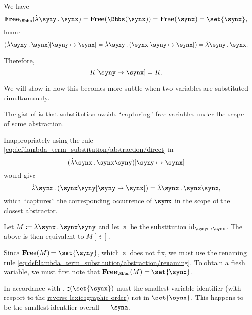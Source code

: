 \begin{example}
\begin{thmenum}
    We have
    \begin{equation*}
      \op*{Free}_\Bbbs(\qabs \syny \synx)
      =
      \op*{Free}(\Bbbs(\synx))
      =
      \op*{Free}(\synx)
      =
      \set{ \synx },
    \end{equation*}
    hence
    \begin{align*}
      (\qabs \syny \synx)[\syny \mapsto \synx]
      =
      \qabs \syny (\synx[\syny \mapsto \synx])
      =
      \qabs \syny \synx.
    \end{align*}

    Therefore,
    \begin{equation*}
      K[\syny \mapsto \synx] = K.
    \end{equation*}

    We will show in  how this becomes more subtle when two variables are substituted simultaneously.

     The gist of  is that substitution avoids \enquote{capturing} free variables under the scope of some abstraction.

    Inappropriately using the rule \eqref{eq:def:lambda_term_substitution/abstraction/direct} in
    \begin{equation*}
      (\qabs \synx \synx \syny)[\syny \mapsto \synx]
    \end{equation*}
    would give
    \begin{equation*}
      \qabs \synx (\synx \syny[\syny \mapsto \synx]) = \qabs \synx \synx \synx,
    \end{equation*}
    which \enquote{captures} the corresponding occurrence of \( \synx \) in the scope of the closest abstractor.

    Let \( M \coloneqq \qabs \synx \synx \syny \) and let \( \Bbbs \) be the substitution \( \id_{\syny \mapsto \synx} \). The above is then equivalent to \( M[\Bbbs] \).

    Since \( \op*{Free}(M) = \set{ \syny } \), which \( \Bbbs \) does not fix, we must use the renaming rule \eqref{eq:def:lambda_term_substitution/abstraction/renaming}. To obtain a fresh variable, we must first note that \( \op*{Free}_\Bbbs(M) = \set{ \synx } \).

    In accordance with , \( \sharp(\set{ \synx }) \) must the smallest variable identifier (with respect to the \hyperref[def:lexicographic_order]{reverse lexicographic order}) not in \( \set{ \synx } \). This happens to be the smallest identifier overall --- \( \syna \).


\end{thmenum}
\end{example}
